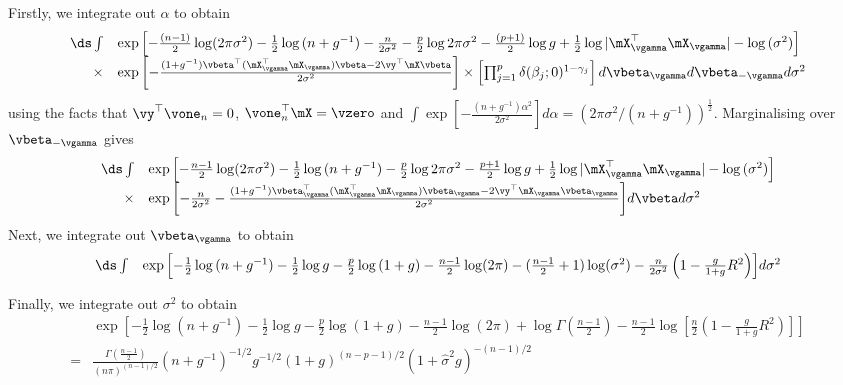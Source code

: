 \noindent Firstly, we integrate out $\alpha$ to obtain
$$
\begin{array}{rl}
		\ds \int & \exp{\left[
		-\frac{(n - 1)}{2} \log (2 \pi \sigma^2) 
		-\frac{1}{2} \log{(n + g^{-1})} 
		-\frac{n}{2 \sigma^2}
		-\frac{p}{2} \log{2\pi \sigma^2} 
		-\frac{(p + 1)}{2} \log{g} 
		+\frac{1}{2} \log{|\mX_\vgamma^\top \mX_\vgamma|}
		-\log{(\sigma^2)}
		\right]}\\
		\times&\exp{\left[
		-\frac{(1 + g^{-1})\vbeta^\top (\mX_\vgamma^\top \mX_\vgamma) \vbeta - 2 \vy^\top \mX \vbeta}{2 \sigma^{2}} 
		\right]} 
		\times \left[ \prod_{j=1}^p \delta(\beta_j; 0)^{1 - \gamma_j} \right] d \vbeta_{\vgamma} d \vbeta_{-\vgamma} d \sigma^2
\end{array}
$$
using the facts that $\vy^\top \vone_n = 0$, $\vone_n^\top \mX = \vzero$ and $\int \exp{\left[-\frac{(n + g^{-1})\alpha^2}{2 \sigma^{2}} \right]} d \alpha = (2 \pi \sigma^{2} / (n + g^{-1}))^{\frac{1}{2}}$.
Marginalising over $\vbeta_{-\vgamma}$ gives
$$
\begin{array}{rl}
		\ds \int &\exp{\left[
		-\frac{n - 1}{2} \log (2 \pi \sigma^2) 
		- \frac{1}{2} \log{(n + g^{-1})}
		-\frac{p}{2} \log{2\pi \sigma^2} 
		- \frac{p + 1}{2} \log{g}
		+ \frac{1}{2} \log{|\mX_\vgamma^\top \mX_\vgamma|} 
		-\log{(\sigma^2)}
		\right]} \\
		\times&\exp{\left[
		-\frac{n}{2 \sigma^2}
		-\frac{(1 + g^{-1})\vbeta_\vgamma^\top (\mX_\vgamma^\top \mX_\vgamma) \vbeta_\vgamma - 2\vy^\top\mX_\vgamma \vbeta_\vgamma}{2 \sigma^{2}} \right]} d \vbeta d \sigma^2
\end{array}
$$
\noindent Next, we integrate out $\vbeta_{\vgamma}$ to obtain
$$
\begin{array}{rl}
		\ds \int &\exp{\left[
		- \frac{1}{2} \log{(n + g^{-1})}
		- \frac{1}{2} \log{g}
		-\frac{p}{2} \log{(1 + g)}
		-\frac{n - 1}{2} \log (2 \pi)
		-(\frac{n - 1}{2} + 1) \log (\sigma^2) 
		-\frac{n}{2 \sigma^2} \left(1 - \frac{g}{1 + g} R^2\right)
		\right]}  d \sigma^2
\end{array}
$$

\noindent Finally, we integrate out $\sigma^2$ to obtain
$$
\begin{array}{rl}
		&\exp{\left[
		- \frac{1}{2} \log{(n + g^{-1})}
		- \frac{1}{2} \log{g}
		-\frac{p}{2} \log{(1 + g)}
		-\frac{n - 1}{2} \log (2 \pi)
		+\log \Gamma(\frac{n-1}{2})
		-\frac{n-1}{2}\log{[\frac{n}{2} (1 - \frac{g}{1 + g} R^2)]}
		\right]} \\
		=&\frac{\Gamma(\frac{n - 1}{2})}{(n \pi)^{(n-1)/2}}
		(n + g^{-1})^{-1/2} g^{-1/2} (1 + g)^{(n - p - 1)/2} (1 + \widehat{\sigma}^2 g)^{-(n - 1)/2}
\end{array}
$$

